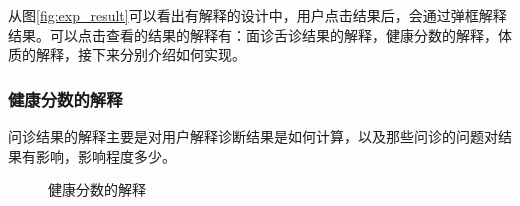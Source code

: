 从图\ref{fig:exp_result}可以看出有解释的设计中，用户点击结果后，会通过弹框解释结果。可以点击查看的结果的解释有：面诊舌诊结果的解释，健康分数的解释，体质的解释，接下来分别介绍如何实现。



\subsubsection{健康分数的解释}
问诊结果的解释主要是对用户解释诊断结果是如何计算，以及那些问诊的问题对结果有影响，影响程度多少。

\begin{figure}[htbp]
    \centering
    \caption{健康分数的解释}
    \label{fig:report_expalin_score}
\end{figure}

